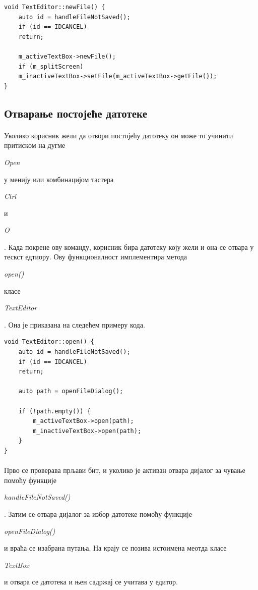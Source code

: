 \documentclass[12pt,oneside]{memoir}
\begin{document}
\begin{verbatim}
void TextEditor::newFile() {
	auto id = handleFileNotSaved();
	if (id == IDCANCEL)
	return;
	
	m_activeTextBox->newFile();
	if (m_splitScreen)
	m_inactiveTextBox->setFile(m_activeTextBox->getFile());
}
\end{verbatim}

\subsection{Отварање постојеће датотеке}
\paragraph{}
Уколико корисник жели да отвори постојећу датотеку он може то учинити притиском
на дугме \begin{latinica}\textit{Open}\end{latinica} у менију или комбинацијом
тастера \begin{latinica}\textit{Ctrl}\end{latinica} и \begin{latinica}\textit{O}\end{latinica}. Када покрене ову команду, корисник
бира датотеку коју жели и она се отвара у тескст едтиору. Ову функционалност
имплементира метода \begin{latinica}\textit{open()}\end{latinica} класе
\begin{latinica}\textit{TextEditor}\end{latinica}. Она је приказана
на следећем примеру кода.

\begin{verbatim}
void TextEditor::open() {
	auto id = handleFileNotSaved();
	if (id == IDCANCEL)
	return;
	
	auto path = openFileDialog();
	
	if (!path.empty()) {
		m_activeTextBox->open(path);
		m_inactiveTextBox->open(path);
	}
}
\end{verbatim}

\paragraph{}
Прво се проверава прљави бит, и уколико је активан отвара дијалог за чување помоћу
функције \begin{latinica}\textit{handleFileNotSaved()}\end{latinica}. Затим се 
отвара дијалог за избор датотеке помоћу функције
\begin{latinica}\textit{openFileDialog()}\end{latinica}  и враћа се изабрана
путања. На крају се позива истоимена меотда класе
\begin{latinica}\textit{TextBox}\end{latinica} и отвара се датотека и њен садржај
се учитава у едитор.
\end{document}
